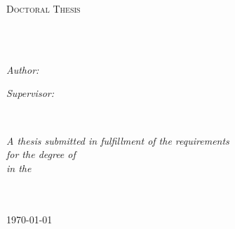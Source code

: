 \documentclass[
12pt, %
english, %
singlespacing, %
headsepline, %
]{MastersDoctoralThesis} %
\author{Cao \textsc{Tuan Anh}} %
\begin{document}
\frontmatter %

\pagestyle{plain} %


\begin{titlepage}
\begin{center}

\vspace*{.06\textheight}
{\scshape\LARGE \univname\par}\vspace{1.5cm} %
\textsc{\Large Doctoral Thesis}\\[0.5cm] %

\HRule \\[0.4cm] %
{\huge \bfseries \ttitle\par}\vspace{0.4cm} %
\HRule \\[1.5cm] %
 
\begin{minipage}[t]{0.4\textwidth}
\begin{flushleft} \large
\emph{Author:}\\
\href{http://www.johnsmith.com}{\authorname} %
\end{flushleft}
\end{minipage}
\begin{minipage}[t]{0.4\textwidth}
\begin{flushright} \large
\emph{Supervisor:} \\
\href{http://www.jamessmith.com}{\supname} %
\end{flushright}
\end{minipage}\\[3cm]
 
\vfill

\large \textit{A thesis submitted in fulfillment of the requirements\\ for the degree of \degreename}\\[0.3cm] %
\textit{in the}\\[0.4cm]
\groupname\\\deptname\\[2cm] %
 
\vfill

{\large \today}\\[4cm] %
 
\vfill
\end{center}
\end{titlepage}
\end{document}
